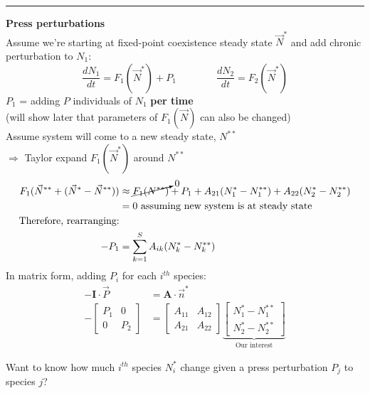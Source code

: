 \documentclass{article}
\newcommand{\ind}{\-\hspace{1cm}}
\begin{document}
\rule[0.5ex]{\linewidth}{1pt}

\textbf{Press perturbations}\\
Assume we're starting at fixed-point coexistence steady state $\vec{N}^*$ and add chronic perturbation to $N_1$:
\begin{equation*}
	\frac{dN_1}{dt}=F_1(\vec{N}^*)+P_1 \qquad \qquad  \frac{dN_2}{dt}=F_2(\vec{N}^*)
\end{equation*}
\ind $P_1$ = adding $P$ individuals of $N_1$ \textbf{per time}\\
\ind \ind (will show later that parameters of $F_1(\vec{N})$ can also be changed)\\

Assume system will come to a new steady state, $N^{**}$\\

$\Rightarrow$ Taylor expand $F_1(\vec{N}^*)$ around $N^{**}$
\begin{align*}
	F_1(\vec{N}^{**}+(\vec{N}^*-\vec{N}^{**})) & \approx \cancelto{0}{F_1(N^{**})} +  P_1 + A_{21}(N_1^*-N_1^{**}) + A_{22}(N_2^*-N_2^{**})\\
	& = 0 \text{ assuming new system is at steady state}\\
	\text{Therefore, rearranging:}&\\
	-P_1 &= \sum_{k=1}^S A_{ik}(N_k^*-N_k^{**})
\end{align*}
In matrix form, adding $P_i$ for each $i^{th}$ species:
\begin{align*}
	-\mathbf{I}\cdot \vec{P}&= \mathbf{A} \cdot \vec{n}^*\\
	-\begin{bmatrix} P_1 & 0\\0 & P_2 \end{bmatrix}&=\begin{bmatrix} A_{11} & A_{12}\\A_{21} & A_{22} \end{bmatrix} \underbrace{\begin{bmatrix} N_1^* - N_1^{**} \\ N_2^* - N_2^{**}	\end{bmatrix}}_{\text{Our interest}}
\end{align*}

Want to know how much $i^{th}$ species $N_i^*$ change given a press perturbation $P_j$ to species $j$?
\end{document}
